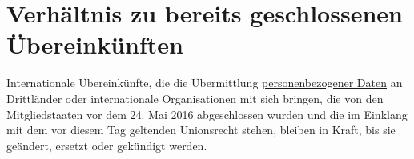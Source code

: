 \chapter{Verhältnis zu bereits geschlossenen Übereinkünften}
\label{ch:96}


Internationale Übereinkünfte, die die Übermittlung \hyperref[itm:04-1]{personenbezogener Daten} an Drittländer oder internationale
Organisationen mit sich bringen, die von den Mitgliedstaaten vor dem 24. Mai 2016 abgeschlossen wurden und die im
Einklang mit dem vor diesem Tag geltenden Unionsrecht stehen, bleiben in Kraft, bis sie geändert, ersetzt oder
gekündigt werden.


